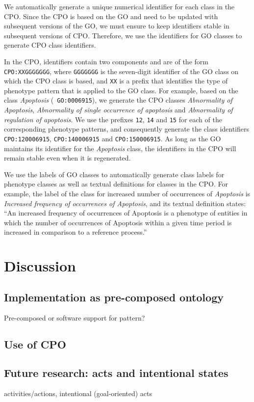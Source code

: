\documentclass{bioinfo}
\begin{document}
We automatically generate a unique numerical identifier for each class
in the CPO.  Since the CPO is based on the GO and need to be updated
with subsequent versions of the GO, we must ensure to keep identifiers
stable in subsequent versions of CPO. Therefore, we use the
identifiers for GO classes to generate CPO class identifiers.

In the CPO, identifiers contain two components and are of the form
{\tt CPO:XXGGGGGGG}, where {\tt GGGGGGG} is the seven-digit identifier
of the GO class on which the CPO class is based, and {\tt XX} is a
prefix that identifies the type of phenotype pattern that is applied
to the GO class. For example, based on the class {\em Apoptosis} ({\tt
  GO:0006915}), we generate the CPO classes {\em Abnormality of
  Apoptosis}, {\em Abnormality of single occurrence of apoptosis} and
{\em Abnormality of regulation of apoptosis}.  We use the prefixes
{\tt 12}, {\tt 14} and {\tt 15} for each of the corresponding
phenotype patterns, and consequently generate the class identifiers
{\tt CPO:120006915}, {\tt CPO:140006915} and {\tt CPO:150006915}. As
long as the GO maintains its identifier for the {\em Apoptosis} class,
the identifiers in the CPO will remain stable even when it is
regenerated.

We use the labels of GO classes to automatically generate class labels
for phenotype classes as well as textual definitions for classes in
the CPO. For example, the label of the class for increased number of
occurrences of {\em Apoptosis} is {\em Increased frequency of
  occurrences of Apoptosis}, and its textual definition states:
``An increased frequency of occurrences of Apoptosis is a phenotype of
entities in which the number of occurrences of Apoptosis within a
given time period is increased in comparison to a reference
process.''

\section{Discussion}
\subsection{Implementation as pre-composed ontology}
Pre-composed or software support for pattern?

\subsection{Use of CPO}

\subsection{Future research: acts and intentional states}
activities/actions, intentional (goal-oriented) acts
\end{document}
